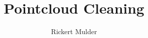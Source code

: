 \documentclass[a4paper,11pt, DIV=calc]{report}
\begin{document}
\tableofcontents

\pagestyle{plain} %
\title{Pointcloud Cleaning}
\author{Rickert Mulder}
\maketitle



\end{document}
